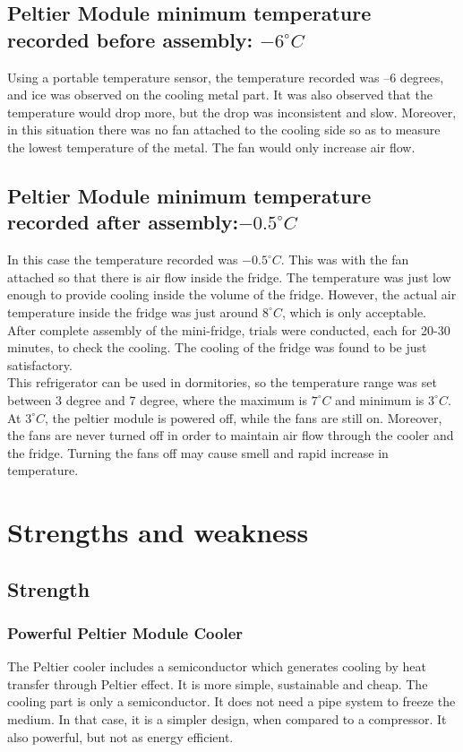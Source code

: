 \documentclass[12pt,onecolumn]{article}
\begin{document}
\subsection{Peltier Module minimum temperature recorded before assembly: $−6^{\circ}C$}
Using a portable temperature sensor, the temperature recorded was –6 degrees, and ice was observed on the cooling metal part. It was also observed that the temperature would drop more, but the drop was inconsistent and slow. Moreover, in this situation there was no fan attached to the cooling side so as to measure the lowest temperature of the metal. The fan would only increase air flow. 

\subsection{Peltier Module minimum temperature recorded after assembly:$-0.5^{\circ}C$} 
In this case the temperature recorded was $-0.5^{\circ}C$. This was with the fan attached so that there is air flow inside the fridge. The temperature was just low enough to provide cooling inside the volume of the fridge. However, the actual air temperature inside the fridge was just around $8^{\circ}C$, which is only acceptable. \\

After complete assembly of the mini-fridge, trials were conducted, each for 20-30 minutes, to check the cooling. The cooling of the fridge was found to be just satisfactory. \\
This refrigerator can be used in dormitories, so the temperature range was set between 3 degree and 7 degree, where the maximum is $7^{\circ}C$ and minimum is $3^{\circ}C$. At $3^{\circ}C$, the peltier module is powered off, while the fans are still on. Moreover, the fans are never turned off in order to maintain air flow through the cooler and the fridge. Turning the fans off may cause smell and rapid increase in temperature. 

\section{Strengths and weakness}
\subsection{Strength}
\subsubsection{Powerful Peltier Module Cooler}
The Peltier cooler includes a semiconductor which generates cooling by heat transfer through Peltier effect. It is more simple, sustainable and cheap. The cooling part is only a semiconductor. It does not need a pipe system to freeze the medium. In that case, it is a simpler design, when compared to a compressor. It also powerful, but not as energy efficient. 
\end{document}

